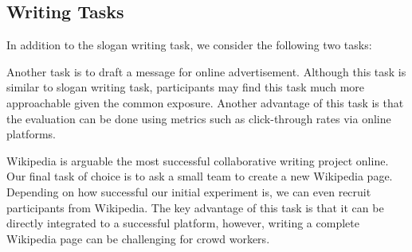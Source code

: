 \subsection{Writing Tasks}
\label{sec:tasks}

In addition to the slogan writing task, we consider the following two tasks:

 Another task is to draft a message for online advertisement.
Although this task is similar to slogan writing task,
participants may find this task much more approachable given the common exposure.
Another advantage of this task is that the evaluation can be done using metrics such as click-through rates via online platforms.

 Wikipedia is arguable the most successful collaborative writing project online.
Our final task of choice is to ask a small team to create a new Wikipedia page.
Depending on how successful our initial experiment is, we can even recruit participants from Wikipedia.
The key advantage of this task is that it can be directly integrated to a successful platform, however, writing a complete Wikipedia page can be challenging for crowd workers.




